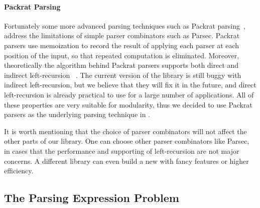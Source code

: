 \paragraph{Packrat Parsing}
Fortunately some more advanced parsing techniques such as Packrat
parsing~\cite{Ford2002}, address the limitations of simple parser combinators
such as Parsec. Packrat parsers use
memoization to record the result of applying each parser at each
position of the input, so that repeated computation is eliminated.
Moreover, theoretically the algorithm behind Packrat parsers
supports both direct and indirect left-recursion ~\cite{warth2008}.
The current version of the library is still
buggy with indirect left-recursion, but we believe that
they will fix it in the future, and direct left-recursion is
already practical to use for a large number of applications. All of these properties are very
suitable for modularity, thus we decided to use Packrat parsers as the underlying
parsing technique in \name.


It is worth mentioning that the choice of parser combinators will not
affect the other parts of our library. One can choose other parser
combinators like Parsec, in cases that the performance and supporting
of left-recursion are not major concerns. A different library can even build a new
\name with fancy features or higher efficiency.

\subsection{The Parsing Expression Problem}\label{subsec:overview-problem}


